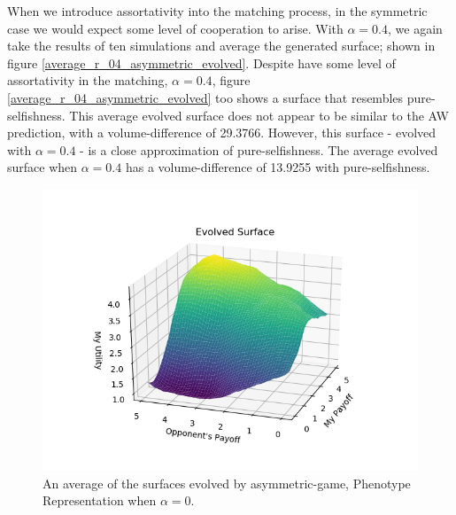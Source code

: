 \documentclass[11pt]{book}
\newcommand*{\np}{\par\noindent\newline}
\begin{document}
\np When we introduce assortativity into the matching process, in the symmetric case we would expect some level of cooperation to arise.
With $\alpha = 0.4$, we again take the results of ten simulations and average the generated surface; shown in figure \ref{average_r_04_asymmetric_evolved}.
Despite have some level of assortativity in the matching, $\alpha = 0.4$, figure \ref{average_r_04_asymmetric_evolved} too shows a surface that resembles pure-selfishness.
This average evolved surface does not appear to be similar to the AW prediction, with a volume-difference of 29.3766.
However, this surface - evolved with $\alpha = 0.4$ - is a close approximation of pure-selfishness.
The average evolved surface when $\alpha = 0.4$ has a volume-difference of 13.9255 with pure-selfishness.

\begin{figure}
	\centering
	\includegraphics[scale=0.7]{resources/asymmetric_average_evolved_surface_r_00.png}
	\caption{An average of the surfaces evolved by asymmetric-game, Phenotype Representation when $\alpha = 0$.}
	\label{average_r_0_asymmetric_evolved}
\end{figure}
\end{document}
